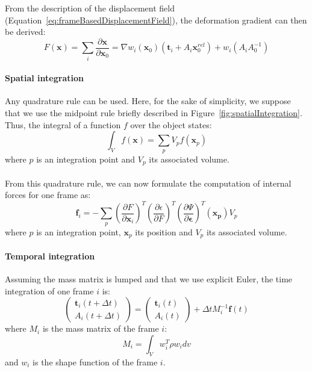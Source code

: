 From the description of the displacement field (Equation~\ref{eq:frameBasedDisplacementField}), the deformation gradient can then be derived:
\begin{equation}
\displaystyle
F\left(\mathbf{x}\right) = \sum_{i} \frac{\partial \mathbf{x}}{\partial \mathbf{x}_{0}} =
\nabla w_{i}(\mathbf{x}_{0}) \left( \mathbf{t}_{i}+A_{i}\mathbf{x}_{0}^{rel}\right) + 
w_{i}\left( A_{i}A_{0}^{-1} \right)
\end{equation}

\paragraph{Spatial integration}

Any quadrature rule can be used. Here, for the sake of simplicity, we suppose that we use the midpoint rule briefly described in Figure~\ref{fig:spatialIntegration}. Thus, the integral of a function $f$ over the object states:
\begin{equation}
\displaystyle
\int_{V} f(\mathbf{x})  = \sum_{p} V_{p} f(\mathbf{x}_{p})
\end{equation}
where $p$ is an integration point and $V_{p}$ its associated volume.
\\ \\
From this quadrature rule, we can now formulate the computation of internal forces for one frame as:
\begin{equation}
\label{eq:frameForceComputation}
\displaystyle
\mathbf{f}_{i} =
- \sum_{p}
\left( \frac{\partial F}{\partial \mathbf{x}_{i}} \right)^{T}
\left( \frac{\partial \epsilon}{\partial F} \right)^{T}
\left( \frac{\partial \Psi}{\partial \mathbf{\epsilon}} \right)^{T} \left(\mathbf{x_{p}}\right) V_{p} 
\end{equation}
where $p$ is an integration point, $\mathbf{x}_{p}$ its position and $V_{p}$ its associated volume.

\paragraph{Temporal integration}

Assuming the mass matrix is lumped and that we use explicit Euler, the time integration of one frame $i$ is:
\begin{equation}
\displaystyle
\begin{pmatrix}
\mathbf{t}_{i}(t+\Delta t) \\
A_{i}(t+\Delta t)
\end{pmatrix} 
=
\begin{pmatrix}
\mathbf{t}_{i}(t) \\
A_{i}(t)
\end{pmatrix} 
+
\Delta t
M_{i}^{-1}
\mathbf{f}(t)
\end{equation}
where $M_{i}$ is the mass matrix of the frame $i$:
\begin{equation}
\label{eq:massMatrix}
M_{i} = \int_{V} w_{i}^{T} \rho w_{i} dv
\end{equation}
and $w_{i}$ is the shape function of the frame $i$.

